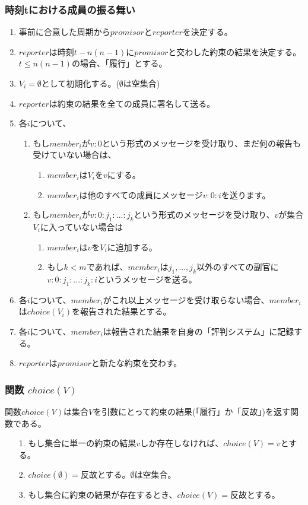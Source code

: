 \subsubsection{時刻tにおける成員の振る舞い}
\label{behaiverAtTimeT}
\begin{enumerate}
  \item 事前に合意した周期から$promisor$と$reporter$を決定する。
  \item $reporter$は時刻$t-n(n-1)$に$promisor$と交わした約束の結果を決定する。$t \leq n(n-1)$の場合、「履行」とする。
  \item $V_i=\emptyset$として初期化する。($\emptyset$は空集合)
  \item $reporter$は約束の結果を全ての成員に署名して送る。
  \item 各$i$について、 
  \begin{enumerate}
    \item もし$member_i$が$v:0$という形式のメッセージを受け取り、まだ何の報告も受けていない場合は、
    \begin{enumerate}
      \item $member_i$は$ V_i$を${v}$にする。 
      \item $member_i$は他のすべての成員にメッセージ$v:0:i$を送ります。
    \end{enumerate}
    \item もし$member_i$が$v:0:j_1:...:j_k$という形式のメッセージを受け取り、$v$が集合$V_i$に入っていない場合は
    \begin{enumerate}
      \item $member_i$は$v$を$V_i$に追加する。
      \item もし$k<m$であれば、$member_i$は$j_1, ..., j_k$以外のすべての副官に$v:0:j_1:...:j_k:i$というメッセージを送る。
    \end{enumerate}
  \end{enumerate}
  \item 各$i$について、$member_i$がこれ以上メッセージを受け取らない場合、$member_i$は$choice(V_i)$を報告された結果とする。
  \item 各$i$について、$member_i$は報告された結果を自身の「評判システム」に記録する。
  \item $reporter$は$promisor$と新たな約束を交わす。
\end{enumerate}

\subsubsection{関数 $choice(V)$}
関数$choice(V)$は集合$V$を引数にとって約束の結果(「履行」か「反故」)を返す関数である。
\begin{enumerate}
  \item[1.] もし集合に単一の約束の結果$v$しか存在しなければ、$choice(V) = v$とする。
  \item[2.] $choice(\emptyset) = 反故$とする。$\emptyset$は空集合。
  \item[3.] もし集合に約束の結果が存在するとき、$choice(V) = 反故$とする。
\end{enumerate}

